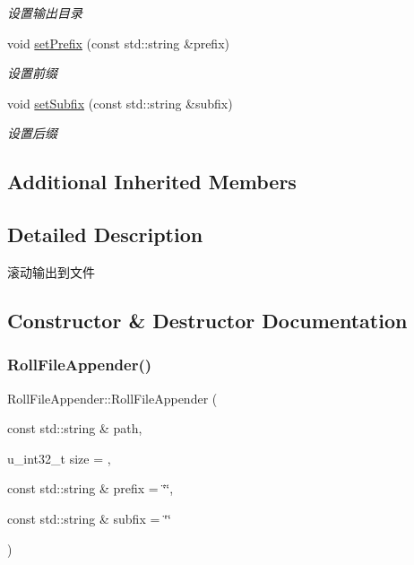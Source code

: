 \begin{DoxyCompactItemize}
\begin{DoxyCompactList}\small\item\em 设置输出目录 \end{DoxyCompactList}\item 
void \hyperlink{classRollFileAppender_aadef86381b7860ad0d20a6236db02563}{set\+Prefix} (const std\+::string \&prefix)
\begin{DoxyCompactList}\small\item\em 设置前缀 \end{DoxyCompactList}\item 
void \hyperlink{classRollFileAppender_aec2fda1393d840c50828c99db6a736da}{set\+Subfix} (const std\+::string \&subfix)
\begin{DoxyCompactList}\small\item\em 设置后缀 \end{DoxyCompactList}\end{DoxyCompactItemize}
\subsection*{Additional Inherited Members}


\subsection{Detailed Description}
滚动输出到文件 

\subsection{Constructor \& Destructor Documentation}
\mbox{\label{classRollFileAppender_a454d6f5e48a3951bf199e05e95008617}} 
\subsubsection{\texorpdfstring{Roll\+File\+Appender()}{RollFileAppender()}}
{\footnotesize\ttfamily Roll\+File\+Appender\+::\+Roll\+File\+Appender (\begin{DoxyParamCaption}\item[{const std\+::string \&}]{path,  }\item[{u\+\_\+int32\+\_\+t}]{size = {},  }\item[{const std\+::string \&}]{prefix = {\ttfamily \char`\"{}\char`\"{}},  }\item[{const std\+::string \&}]{subfix = {\ttfamily \char`\"{}\char`\"{}} }\end{DoxyParamCaption})}



